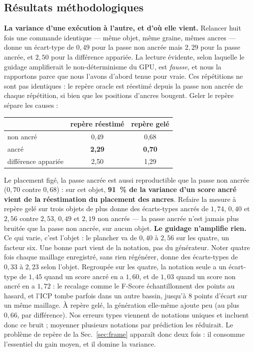 \documentclass[conference]{IEEEtran}
\begin{document}
\subsection{Résultats méthodologiques}
\label{sec:methodology}

\textbf{La variance d'une exécution à l'autre, et d'où elle vient.} Relancer huit fois
une commande identique --- même objet, même graine, mêmes ancres --- donne un
écart-type de $0{,}49$ pour la passe non ancrée mais $2{,}29$ pour la passe ancrée, et
$2{,}50$ pour la différence appariée. La lecture évidente, selon laquelle le guidage
amplifierait le non-déterminisme du GPU, est \emph{fausse}, et nous la rapportons
parce que nous l'avons d'abord tenue pour vraie. Ces répétitions ne sont pas
identiques : le repère oracle est réestimé depuis la passe non ancrée de chaque
répétition, si bien que les positions d'ancres bougent. Geler le repère sépare les
causes :

\begin{center}\small
\begin{tabular}{lcc}
\toprule
& repère réestimé & repère gelé \\
\midrule
non ancré & 0,49 & 0,68 \\
ancré & \textbf{2,29} & \textbf{0,70} \\
différence appariée & 2,50 & 1,29 \\
\bottomrule
\end{tabular}
\end{center}

Le placement figé, la passe ancrée est aussi reproductible que la passe non ancrée
($0{,}70$ contre $0{,}68$) : sur cet objet, \textbf{91~\% de la variance d'un score ancré
vient de la réestimation du placement des ancres}. Refaire la mesure à repère gelé sur
trois objets de plus donne des écarts-types ancrés de $1{,}74$, $0{,}40$ et $2{,}56$
contre $2{,}53$, $0{,}49$ et $2{,}19$ non ancrés --- la passe ancrée n'est jamais plus
bruitée que la passe non ancrée, sur aucun objet. \textbf{Le guidage n'amplifie rien.}
Ce qui varie, c'est l'objet : le plancher va de $0{,}40$ à $2{,}56$ sur les quatre, un
facteur six. Une bonne part vient de la notation,
pas du générateur. Noter quatre fois chaque maillage enregistré, sans rien régénérer,
donne des écarts-types de $0{,}33$ à $2{,}23$ selon l'objet. Regroupée sur les quatre,
la notation seule a un écart-type de $1{,}45$ quand un score ancré en a $1{,}60$, et de
$1{,}03$ quand un score non ancré en a $1{,}72$ : le recalage comme le F-Score
échantillonnent des points au hasard, et l'ICP tombe parfois dans un autre bassin,
jusqu'à $8$ points d'écart sur un même maillage. À repère gelé, la génération elle-même
ajoute peu (au plus $0{,}66$, par différence). Nos erreurs types viennent de notations
uniques et incluent donc ce bruit ; moyenner plusieurs notations par prédiction les
réduirait. Le
problème de repère de la Sec.~\ref{sec:frame} apparaît donc deux fois : il consomme
l'essentiel du gain moyen, et il domine la variance.
\end{document}
